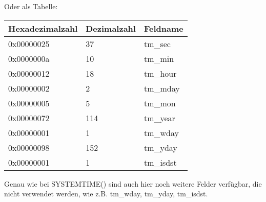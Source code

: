 Oder als Tabelle:

\begin{center}
\begin{tabular}{ | l | l | l | }
\hline
\headercolor{} Hexadezimalzahl & 
\headercolor{} Dezimalzahl & 
\headercolor{} Feldname \\
\hline
0x00000025 & 37 	& tm\_sec \\
\hline
0x0000000a & 10 	& tm\_min \\
\hline
0x00000012 & 18 	& tm\_hour \\	
\hline
0x00000002 & 2 		& tm\_mday \\	
\hline
0x00000005 & 5 		& tm\_mon \\	
\hline
0x00000072 & 114 	& tm\_year \\
\hline
0x00000001 & 1 		& tm\_wday \\	
\hline
0x00000098 & 152 	& tm\_yday \\	
\hline
0x00000001 & 1 		& tm\_isdst \\
\hline
\end{tabular}
\end{center}
Genau wie bei SYSTEMTIME() sind auch hier noch weitere Felder verfügbar, die nicht verwendet
werden, wie z.B. tm\_wday, tm\_yday, tm\_isdst.
